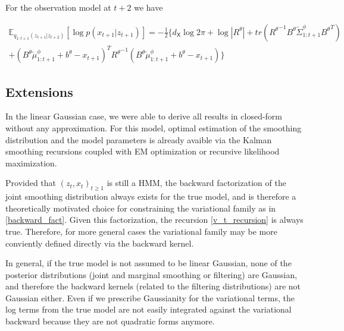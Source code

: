 \documentclass{article}
\newcommand{\1}{\mathbbm{1}}
\newcommand{\expect}[2]{\mathbb{E}_{#1}\left[#2\right]}
\newcommand{\backward}[1]{\overleftarrow{#1}}
\newcommand{\vbackwardparam}[2]{\backward{#1}_{1:#2}^\phi}
\newcommand{\vbackwardmean}[1]{\vbackwardparam{\mu}{#1}}
\newcommand{\vbackwardcov}[1]{\vbackwardparam{\Sigma}{#1}}
\newcommand{\inv}[1]{{#1}^{-1}}
\newcommand{\quadform}[2]{#1^T #2 #1}
\begin{document}
For the observation model at $t+2$ we have

\begin{multline*}
\expect{q_{1:t+1}(z_{t+1}|z_{t+2})}{\log p(x_{t+1}|z_{t+1})} = -\frac{1}{2}\{d_{\mathsf{X}}\log 2\pi + \log |R^\theta| + tr\left(\inv{R^\theta} B^\theta\vbackwardcov{t+1}{B^\theta}^T\right) \\ + \quadform{(B^\theta\vbackwardmean{t+1} + b^\theta - x_{t+1})}{\inv{R^\theta}}\}
\end{multline*} 


\subsection{Extensions}

In the linear Gaussian case, we were able to derive all results in closed-form without any approximation. For this model, optimal estimation of the smoothing distribution and the model parameters is already avaible via the Kalman smoothing recursions coupled with EM optimization or recursive likelihood maximization. 

Provided that $(z_t,x_t)_{t \geq 1}$ is still a HMM, the backward factorization of the joint smoothing distribution always exists for the true model, and is therefore a theoretically motivated choice for constraining the variational family as in \ref{backward_fact}. Given this factorization, the recursion \ref{v_t_recursion} is always true. Therefore, for more general cases the variational family may be more conviently defined directly via the backward kernel. 

In general, if the true model is not assumed to be linear Gaussian, none of the posterior distributions (joint and marginal smoothing or filtering) are Gaussian, and therefore the backward kernels (related to the filtering distributions) are not Gaussian either. Even if we prescribe Gaussianity for the variational terms, the log terms from the true model are not easily integrated against the variational backward because they are not quadratic forms anymore. 
\end{document}

